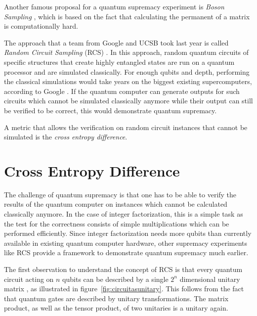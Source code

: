 Another famous proposal for a quantum supremacy experiment is \textit{Boson Sampling} \cite{aaronson2013boson}, which is based on the
fact that calculating the permanent of a matrix is computationally hard.

The approach that a team from Google and UCSB took last year is called \textit{Random
  Circuit Sampling} (RCS) \cite{Boixo2018supremacy, martines2019supremacy}. In this approach, random quantum circuits of specific structures that create highly
entangled states are run on a quantum processor and are simulated classically. For
enough qubits and depth, performing the classical simulations would take years on the biggest 
existing supercomputers, according to Google \cite{martines2019supremacy}. If the quantum computer can generate outputs
for such circuits which cannot be simulated classically anymore while their output can still be
verified to be correct, this would demonstrate quantum supremacy. 

A metric that
allows the verification on random circuit instances that cannot be simulated is
the \textit{cross entropy difference}.

\section{Cross Entropy Difference}
\label{sec:cross_entropy}

The challenge of quantum supremacy is that one has to be able to verify the
results of the quantum computer on instances which cannot be calculated
classically anymore. In the case of integer factorization, this is a simple task
as the test for the correctness consists of simple multiplications which can be
performed efficiently. Since integer factorization needs more qubits than
currently available in existing quantum computer hardware, other supremacy
experiments like RCS provide a framework to demonstrate quantum supremacy much
earlier.

The first observation to understand the concept of RCS is that every quantum
circuit acting on $n$ qubits can be described by a single $2^n$ dimensional
unitary matrix \cite{nielsen2002quantum}, as illustrated in figure~\ref{fig:circuitasunitary}. This follows
from the fact that quantum gates are described by unitary transformations.
The matrix product, as well as the tensor product, of two unitaries is a unitary again.

